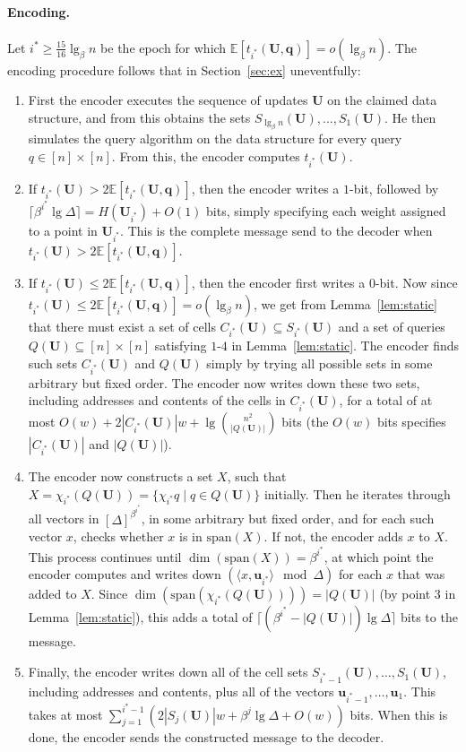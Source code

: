 \documentclass[letterpaper]{article}
\newcommand{\E}{\mathbb{E}}
\newcommand{\is}{{i^*}}
\newcommand{\vecspan}{\textrm{span}}
\newcommand{\VecSet}{X}
\newcommand{\uv}{\textbf{u}}
\newcommand{\U}{\textbf{U}}
\newcommand{\inc}[1]{\chi_{#1}}
\newcommand{\q}{\textbf{q}}
\begin{document}
\paragraph{Encoding.}
Let $\is \geq \tfrac{15}{16} \lg_\beta n$ be the epoch for which
$\E[t_\is(\U,\q)] = o(\lg_\beta n)$. The encoding procedure follows
that in Section~\ref{sec:ex} uneventfully:
\begin{enumerate}
\item First the encoder executes the sequence of updates $\U$ on the
  claimed data structure, and from this obtains the sets $S_{\lg_\beta
    n}(\U),\dots,S_1(\U)$. He then simulates the query algorithm on the
  data structure for every query $q \in [n] \times [n]$. From this,
  the encoder computes $t_\is(\U)$.
\item If $t_\is(\U) > 2\E[t_\is(\U,\q)]$, then the encoder writes a
  $1$-bit, followed by $\lceil \beta^\is \lg \Delta\rceil =
  H(\U_\is)+O(1)$ bits, simply specifying each weight assigned to a
  point in $\U_\is$.  This is the complete message send to the decoder
  when $t_\is(\U) > 2\E[t_\is(\U,\q)]$.
\item If $t_\is(\U) \leq 2\E[t_\is(\U,\q)]$, then the encoder first
  writes a $0$-bit. Now since $t_\is(\U) \leq 2\E[t_\is(\U,\q)] =
  o(\lg_\beta n)$, we get from Lemma~\ref{lem:static} that there must
  exist a set of cells $C_\is(\U) \subseteq S_\is(\U)$ and a set of
  queries $Q(\U) \subseteq [n] \times [n]$ satisfying $1$-$4$ in
  Lemma~\ref{lem:static}. The encoder finds such sets $C_\is(\U)$ and
  $Q(\U)$ simply by trying all possible sets in some arbitrary but
  fixed order. The encoder now writes down these two sets,
  including addresses and contents of the cells in $C_\is(\U)$, for a
  total of at most $O(w)+2|C_\is(\U)|w+\lg \binom{n^2}{|Q(\U)|}$ bits (the
  $O(w)$ bits specifies $|C_\is(\U)|$ and $|Q(\U)|$).

\item The encoder now constructs a set $\VecSet$, such that
  $\VecSet=\inc{\is}(Q(\U)) = \{ \inc{\is}{q} \mid q \in Q(\U) \}$
  initially. Then he iterates through all vectors in
  $[\Delta]^{\beta^\is}$, in some arbitrary but fixed order, and for
  each such vector $x$, checks whether $x$ is in
  $\vecspan(\VecSet)$. If not, the encoder adds $x$ to $\VecSet$. This
  process continues until $\dim(\vecspan(\VecSet))=\beta^\is$, at
  which point the encoder computes and writes down $(\langle x,\uv_\is
  \rangle \mod \Delta)$ for each $x$ that was added to
  $\VecSet$. Since $\dim(\vecspan(\inc{\is}(Q(\U))))=|Q(\U)|$ (by
  point 3 in Lemma~\ref{lem:static}), this adds a total of $\lceil
  (\beta^\is-|Q(\U)|) \lg \Delta \rceil$ bits to the message.

\item Finally, the encoder writes down all of the cell sets
  $S_{\is-1}(\U),\dots,S_1(\U)$, including addresses and contents,
  plus all of the vectors $\uv_{\is-1},\dots, \uv_1$. This takes at
  most $\sum_{j=1}^{\is-1}(2|S_j(\U)|w+\beta^j \lg \Delta+O(w))$
  bits. When this is done, the encoder sends the constructed message
  to the decoder.
\end{enumerate}
\end{document}
